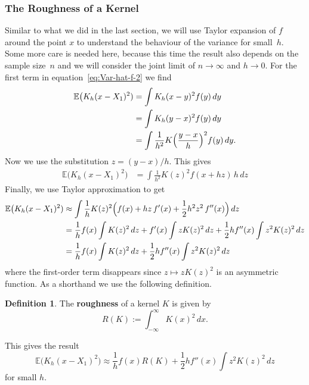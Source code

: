 \documentclass[
  a4paper,
]{article}
\theoremstyle{definition}
\newtheorem{definition}{Definition}[section]
\theoremstyle{definition}
\theoremstyle{definition}
\theoremstyle{definition}
\theoremstyle{remark}
\begin{document}
\subsubsection{The Roughness of a Kernel}\label{the-roughness-of-a-kernel}

Similar to what we did in the last section, we will use Taylor expansion
of \(f\) around the point \(x\) to understand the behaviour of the variance
for small~\(h\). Some more care is needed here, because this time the
result also depends on the sample size~\(n\) and we will consider the joint
limit of \(n \to \infty\) and \(h\to 0\). For the first term in
equation~\eqref{eq:Var-hat-f-2} we find
\begin{align*}
  \mathbb{E}\bigl( K_h(x - X_1)^2 )
  &= \int K_h(x - y)^2 f(y) \,dy \\
  &= \int K_h(y - x)^2 f(y) \,dy \\
  &= \int \frac{1}{h^2} K\Bigl( \frac{y - x}{h} \Bigr)^2 f(y) \,dy.
\end{align*}
Now we use the substitution \(z = (y - x) / h\). This gives
\begin{align*}
  \mathbb{E}\bigl( K_h(x - X_1)^2 )
  &= \int \frac{1}{h^2} K(z)^2 f(x + hz) \,h \,dz
\end{align*}
Finally, we use Taylor approximation to get
\begin{align*}
  \mathbb{E}\bigl( K_h(x - X_1)^2 )
  &\approx \int \frac{1}{h} K(z)^2 \Bigl( f(x) + hz\,f'(x) + \frac12 h^2 z^2 \,f''(x) \Bigr) \,dz \\
  &= \frac{1}{h} f(x) \int K(z)^2 \,dz
      + f'(x) \int z K(z)^2 \,dz
      + \frac12 h f''(x) \int z^2 K(z)^2 \,dz \\
  &= \frac{1}{h} f(x) \int K(z)^2 \,dz
      + \frac12 h f''(x) \int z^2 K(z)^2 \,dz
\end{align*}
where the first-order term disappears since \(z \mapsto z K(z)^2\) is an
asymmetric function. As a shorthand we use the following definition.

\begin{definition}
The \textbf{roughness} of a kernel \(K\) is given by
\begin{equation*}
  R(K)
  := \int_{-\infty}^\infty K(x)^2 \,dx.
\end{equation*}
\end{definition}

This gives the result
\begin{equation}
  \mathbb{E}\bigl( K_h(x - X_1)^2 \bigr)
  \approx \frac{1}{h} f(x) R(K) + \frac12 h f''(x) \int z^2 K(z)^2 \,dz
                             \label{eq:Var-frag1}
\end{equation}
for small \(h\).
\end{document}
